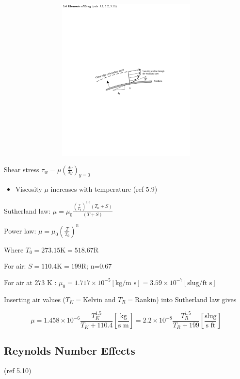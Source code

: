 \documentclass[
]{book}
\providecommand{\tightlist}{%
  \setlength{\itemsep}{0pt}\setlength{\parskip}{0pt}}
\begin{document}
\includegraphics[width=7.825in,height=3.25in]{media/05/image25.png}

Shear stress \(\tau_w = \mu \left( \frac{dv}{dy} \right)_{y=0}\)

\begin{itemize}
\tightlist
\item
  Viscosity \(\mu\) increases with temperature (ref 5.9)
\end{itemize}

Sutherland law: \(\mu = \mu_0 \frac{\left( \frac{T}{T_0} \right)^{1.5} \left( T_0 + S \right)}{\left( T + S \right)}\)

Power law: \(\mu = \mu_0 \left( \frac{T}{T_0} \right)^n\)

Where \(T_0 = 273.15 \text{K} = 518.67 \text{R}\)

For air: \(S = 110.4 \text{K} = 199 \text{R} \text{; n=0.67}\)

For air at \(273\) K : \(\mu_0 = 1.717 \times 10^{-5} \left[\text{kg/m s}\right] = 3.59 \times 10^{-7} \left[\text{slug/ft s}\right]\)

Inserting air values (\(T_K=\)Kelvin and \(T_R=\)Rankin) into Sutherland law gives

\[\mu = 1.458 \times 10^{-6} \frac{T_K^{1.5}}{T_K+110.4} \left[\frac{\text{kg}}{\text{s m}}\right] = 2.2 \times 10^{-8} \frac{T_R^{1.5}}{T_R+199} \left[\frac{\text{slug}}{\text{s ft}}\right]\]

\hypertarget{reynolds-number-effects}{%
\subsection{Reynolds Number Effects}\label{reynolds-number-effects}}

(ref 5.10)
\end{document}
